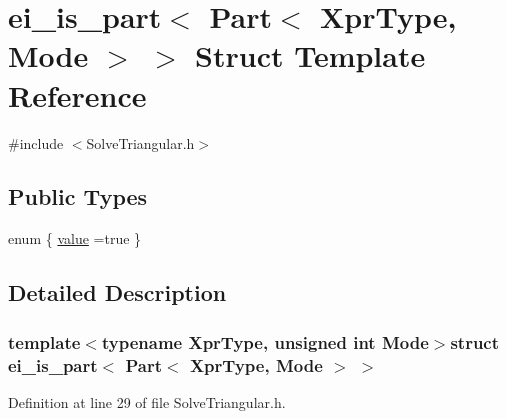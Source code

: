 \hypertarget{structei__is__part_3_01_part_3_01_xpr_type_00_01_mode_01_4_01_4}{\section{ei\-\_\-is\-\_\-part$<$ Part$<$ Xpr\-Type, Mode $>$ $>$ Struct Template Reference}
\label{structei__is__part_3_01_part_3_01_xpr_type_00_01_mode_01_4_01_4}
}


{\ttfamily \#include $<$Solve\-Triangular.\-h$>$}

\subsection*{Public Types}
\begin{DoxyCompactItemize}
\item 
enum \{ \hyperlink{structei__is__part_3_01_part_3_01_xpr_type_00_01_mode_01_4_01_4_a2c2a395da5c28d3f2a3d4329b1806656acd6a41df757d9cd0f8a7e46264a86dc0}{value} =true
 \}
\end{DoxyCompactItemize}


\subsection{Detailed Description}
\subsubsection*{template$<$typename Xpr\-Type, unsigned int Mode$>$struct ei\-\_\-is\-\_\-part$<$ Part$<$ Xpr\-Type, Mode $>$ $>$}



Definition at line 29 of file Solve\-Triangular.\-h.



